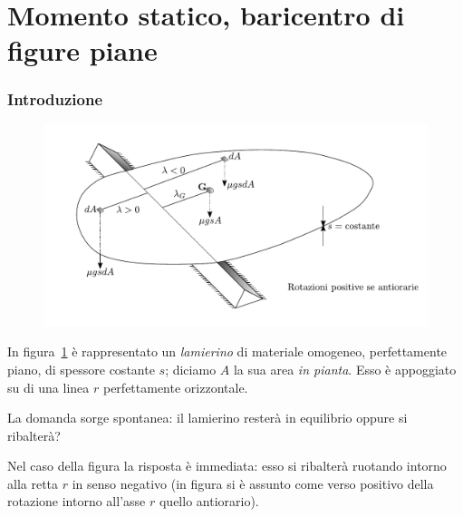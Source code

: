 \pagestyle{fancy}
\part{Momento statico, baricentro di figure piane}
\section{Introduzione}
\label{paragrafo1-1}
\renewcommand{\thefigure}{1~-~1}
\begin{figure}[h]
\centering
\includegraphics[width=\textwidth]{Immagini/Parte_1/Figura1_1/Figura1_1.pdf}
\caption{}
\label{figura1-1}
\end{figure}
\noindent In figura~\ref{figura1-1} è rappresentato un \emph{lamierino} di materiale omogeneo, perfettamente piano, di spessore costante $s$; diciamo $A$ la sua area \emph{in pianta}. Esso è appoggiato su di una linea $r$ perfettamente orizzontale.

\noindent La domanda sorge spontanea: il lamierino resterà in equilibrio oppure si ribalterà?

\noindent Nel caso della figura la risposta è immediata: esso si ribalterà ruotando intorno alla retta $r$ in senso negativo (in figura si è assunto come verso positivo della rotazione intorno all'asse $r$ quello antiorario).

